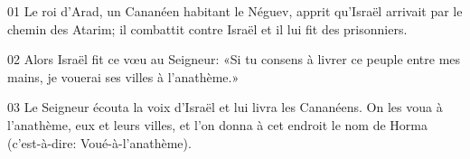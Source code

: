01 Le roi d’Arad, un Cananéen habitant le Néguev, apprit qu’Israël arrivait par le chemin des Atarim; il combattit contre Israël et il lui fit des prisonniers.

02 Alors Israël fit ce vœu au Seigneur: «Si tu consens à livrer ce peuple entre mes mains, je vouerai ses villes à l’anathème.»

03 Le Seigneur écouta la voix d’Israël et lui livra les Cananéens. On les voua à l’anathème, eux et leurs villes, et l’on donna à cet endroit le nom de Horma (c’est-à-dire: Voué-à-l’anathème).

